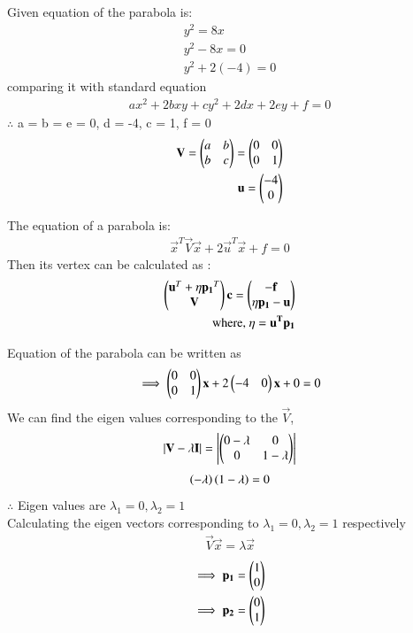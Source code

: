 
Given equation of the parabola is:
\begin{align}
    y^2=8x\\
    y^2-8x=0\\
    y^2+2(-4)=0
\end{align}
comparing it with standard equation
\begin{align}
    ax^2+2bxy+cy^2+2dx+2ey+f=0
\end{align}
$\therefore$  a = b = e = 0, d = -4, c = 1, f = 0
\begin{align}
   \mathbf{V}=\begin{pmatrix}a&b\\b&c\end{pmatrix}=\begin{pmatrix}0&0\\0&1\end{pmatrix}\\
   \mathbf{u}=\begin{pmatrix}-4\\0\end{pmatrix} 
\end{align}
\begin{lemma}
The equation of a parabola is:
\begin{align}
    \vec{x}^T\vec{V}\vec{x}+2\vec{u}^T\vec{x}+f=0
\end{align}
Then its vertex can be calculated as :
\begin{align}
    \begin{pmatrix}\mathbf{u}^T+\eta\mathbf{p_1}^T\\\mathbf{V}\end{pmatrix}\mathbf{c}=\begin{pmatrix}\mathbf{-f}\\\eta\mathbf{p_1}-\mathbf{u}\end{pmatrix}\\
    \text{where, } \eta=\mathbf{u^T}\mathbf{p_1}
\end{align}
\end{lemma}
Equation of the parabola can be written as
\begin{align}
   \implies \begin{pmatrix}0&0\\0&1\end{pmatrix}\mathbf{x}+2\begin{pmatrix}-4&0\end{pmatrix}\mathbf{x}+0=0
\end{align}
We can find the eigen values corresponding to the $\vec{V}$,
\begin{align}
\left|\mathbf{V}-\lambda\mathbf{I}\right| =\left|\begin{pmatrix}0-\lambda&0\\0&1-\lambda\end{pmatrix}\right|
\end{align}
\begin{align}
    \left(-\lambda\right)\left(1-\lambda\right)=0
\end{align}
$\therefore$
Eigen values are $ \lambda_1=0,\lambda_2=1$
\\
Calculating the eigen vectors corresponding to  $ \lambda_1=0,\lambda_2=1$ respectively
\begin{align}
    \vec{V}\vec{x}=\lambda\vec{x}
\end{align}
\begin{align}
   \implies \mathbf{p_1}=\begin{pmatrix}1\\0\end{pmatrix}\\
   \implies \mathbf{p_2}=\begin{pmatrix}0\\1\end{pmatrix}
\end{align}
